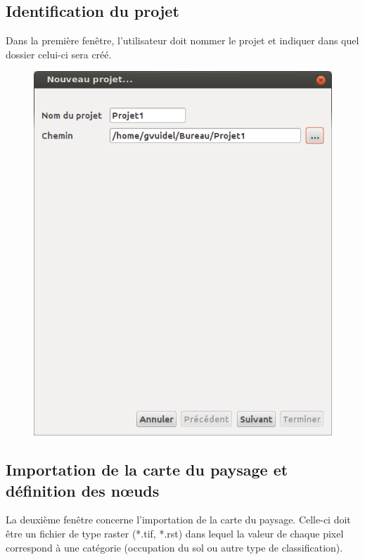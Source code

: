 \documentclass{article}
\begin{document}
\subsection{Identification du projet}

Dans la première fenêtre, l’utilisateur doit nommer le projet et indiquer dans quel dossier celui-ci sera créé.

\begin{figure}[H]
	\includegraphics[scale=0.5]{img/manual-fr_img2.png} 
\end{figure}

\subsection{Importation de la carte du paysage et définition des nœuds}

La deuxième fenêtre concerne l’importation de la carte du paysage. Celle-ci doit être un fichier de type raster (*.tif, *.rst) dans lequel la valeur de chaque pixel correspond à une catégorie (occupation du sol ou autre type de classification).
\end{document}
